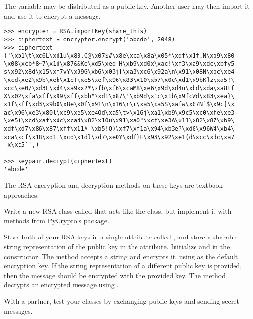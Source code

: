 The  variable may be distributed as a public key.
Another user may then import it and use it to encrypt a message.

\begin{lstlisting}
>>> encrypter = RSA.importKey(share_this)
>>> ciphertext = encrypter.encrypt('abcde', 2048)
>>> ciphertext
('\xb1\t\xc6L\xd1u\x80.C@\x07$#\x8e\xca\x8a\x05*\xdf\x1f.N\xa9\x80
\x08\xcb*8~7\x1d\x87&&Ke\xd5\xed_H\xb9\xd0x\xac!\xf3\xa9\xdc\xbfy5
s\x92\x8d\x15\xf7vY\x99G\xb6\x03j[\xa3\xc6\x92a\n\x91\x08N\xbc\xe4
\xcd\xe2\x9b\xeb\x1eT\xe5\xef\x96\x83\x10\xb7\x0c\xd1\x9bK]z\xa5!\
xcc\xe0/\xd3L\xd4\xa9xx?*\xfb\xf6\xcaM8\xe6\x9d\xd4u\xbd\xda\xa8tf
X\x02\xfa\xff\x99\xff\xbb"\xd1\x87\'\xb9d\x1c\x1b\x9fcWd\x83\xea}\
x1f\xff\xd3\x9b0\x8e\x0f\x91\n\x16\r\r\xa5\xa5S\xafw\x07N`$\x9c]\x
ac\x96\xe3\x80l\xc9\xe5\xe4Od\xa5\t>\x16j\xa1\xb9\x9c5\xc0\xfe\xe3
\xe5i\xcd\xaf\xdc\xcad\x82\x10u\x91\xa0"\xcf\xe3A\x11\x82\x87\xb9\
xdf\xd7\x86\x87\xff\x11#-\xb5!Q)\xf7\xf1a\x94\xb3e?\xd0\x96W4\xb4\
xca\xcf\x18\xd1I\xcd\x1dl\xd7\xe0Y\xdf}F\x93\x92\xe1(d\xcc\xdc\xa7
 x\xc5`',)

>>> keypair.decrypt(ciphertext)
'abcde'
\end{lstlisting}

The RSA encryption and decryption methods on these keys are textbook approaches.

\begin{comment}
However, to increase security, we will want to pad the messages so every message encrypted with a particular key will become exactly as large (in bits) as the key itself.
A commonly used padding algorithm is implemented in PyCrypto in the \li{Crypto.Cipher.PKCS1_OAEP} module.
\begin{lstlisting}
>>> from Crypto.Cipher import PKCS1_OAEP as oaep

# generate a new key from the original RSA key.
# This key can encrypt and decrypt
>>> paddedkey = oaep.new(keypair)
>>> encrypted = paddedkey.encrypt('hello world')
>>> paddedkey.decrypt(encrypted)
'hello world'
\end{lstlisting}
\end{comment}

\begin{problem}
Write a new RSA class called  that acts like the  class, but implement it with methods from PyCrypto's  package.

Store both of your RSA keys in a single attribute called , and store a sharable string representation of the public key in the  attribute.
Initialize  and  in the constructor.
The \li{encrypt} method accepts a string and encrypts it, using \li{_keypair} as the default encryption key.
If the string representation of a different public key is provided, then the message should be encrypted with the provided key.
The \li{decrypt} method decrypts an encrypted message using \li{_keypair}.

With a partner, test your classes by exchanging public keys and sending secret messages.
\end{problem}

